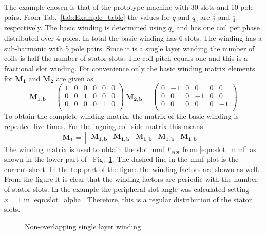 The example chosen is that of the prototype machine with 30 slots and 10 pole pairs. 
From Tab.~\ref{tab:Example_table} the values for $q$ and $q_c$ are $\frac{1}{2}$ and $\frac{1}{4}$ respectively. The basic winding is determined using $q_c$ and has one  coil per phase distributed over 4 poles. In total the basic winding has 6 slots. The winding has a sub-harmonic with 5 pole pairs. Since it is a single layer winding the number of coils is half the number of stator slots. The coil pitch equals one and this is a fractional slot winding. For convenience only the basic winding matrix elements for $\mathbf{M_1}$ and $\mathbf{M_2}$ are given as
\begin{equation}
  \mathbf{M_{1,b}} = 
  \begin{pmatrix}
  1&0&0&0&0&0\\
  0&0&1&0&0&0\\
  0&0&0&0&1&0\\
  \end{pmatrix} \
  \mathbf{M_{2,b}} = 
  \begin{pmatrix}
  0&-1&0&0 &0&0 \\
  0&0 &0&-1&0&0 \\
  0&0 &0&0 &0&-1\\
  \end{pmatrix} 
\end{equation}
To obtain the complete winding matrix, the matrix of the basic winding is repeated five times. For the ingoing coil side matrix this means
\begin{equation}
  \mathbf{M_1} = 
  \begin{bmatrix}
  \mathbf{M_{1,b}}&\mathbf{M_{1,b}}&\mathbf{M_{1,b}}&
  \mathbf{M_{1,b}}&\mathbf{M_{1,b}}
  \end{bmatrix}  
\end{equation}
The winding matrix is used to obtain the slot mmf $F_{slot}$ from \eqref{eqn:slot_mmf} as shown in the lower part of~%
Fig.~\ref{fig:Main_non-overlapping_single}\subref{fig:f_Qs30_p10_1}. The dashed line in the mmf plot is the current sheet. In the top part of the figure the winding factors are shown as well. From the figure it is clear that the winding factors are periodic with the number of stator slots. In the example the peripheral slot angle was calculated setting $x=1$ in \eqref{eqn:slot_alpha}. Therefore, this is a regular distribution of the stator slots.
\begin{figure}[htbp]
	\centering
  \fontsize{6}{6}\selectfont
  \hfill
	\caption{Non-overlapping single layer winding}
	\label{fig:Main_non-overlapping_single}
\end{figure}


